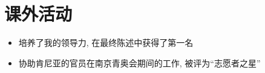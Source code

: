 \section{课外活动}
\begin{itemize}
  \item 培养了我的领导力, 在最终陈述中获得了第一名
\end{itemize}

\begin{itemize}
  \item 协助肯尼亚的官员在南京青奥会期间的工作, 被评为``志愿者之星''
\end{itemize}